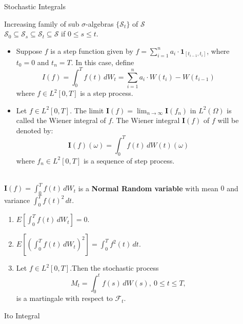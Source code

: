 \documentclass[final]{beamer}
\newlength{\sepwidth}
\newlength{\colwidth}
\newcommand{\separatorcolumn}{\begin{column}{\sepwidth}\end{column}}
\begin{document}
\begin{frame}[t]
\begin{columns}[t]
\begin{column}{\colwidth}
\end{column}

\separatorcolumn

\begin{column}{\colwidth}

  \begin{block}{Stochastic Integrals}
  
   Increasing family of sub $\sigma$-algebras $\{\mathcal{S}_t\}$ of $\mathcal{S}$\\
       $\mathcal{S}_0  \subseteq \mathcal{S}_s  \subseteq \mathcal{S}_t  \subseteq \mathcal{S}$ if $0 \leq s \leq t$.
   \\
        \begin{itemize}
        \item Suppose $f$ is a step function given by $f = \sum_{i=1}^n a_i \cdot \mathbf{1}_{[t_{i-1}, t_i]}$, where $t_0 = 0$ and $t_n = T$. In this case, define 
        \[I(f) = \int_0^{T}{f(t)\,dW_t} = \sum_{i=1}^n a_i \cdot W(t_i) - W(t_{i-1})\]
        where $f \in L^2[0,T]$ is a step process.

            \item Let $f \in L^2[0,T]$. The limit $\mathbf{I}(f) = \lim_{n \to \infty} \mathbf{I}(f_n)$ in $L^2(\Omega)$ is called the Wiener integral of $f$. The Wiener integral $\mathbf{I}(f)$ of $f$ will be denoted by:
\[ \mathbf{I}(f)(\omega) = \int_{0}^{T} f(t) \, dW(t)(\omega) \]
 where $f_n \in L^2[0,T]$ is a sequence of step process.
        \end{itemize}
        
        
          \\
         $\mathbf{I}(f) = \int_0^T f(t)\,dW_t$ is a \textbf{Normal Random variable} with mean $0$ and variance $\int_0^T f(t)^{2}\,dt$.
\begin{enumerate}
    \item $E[\int_0^T f(t)\,dW_t] = 0$.
    \item $E[(\int_0^T f(t)\,dW_t)^{2}] = \int_0^T f^{2}(t)\,dt$.
    \item Let $f \in L^2[0,T]$.Then the stochastic process \[ M_t = \int_0^t f(s)\,dW(s),\ 0 \leq t \leq T,\] is a martingale with respect to $\mathcal{F}_t$.
\end{enumerate}
  \end{block}

  \begin{block}{It$\hat{\text{o}}$ Integral}


\end{block}
\end{column}
\end{columns}
\end{frame}
\end{document}
